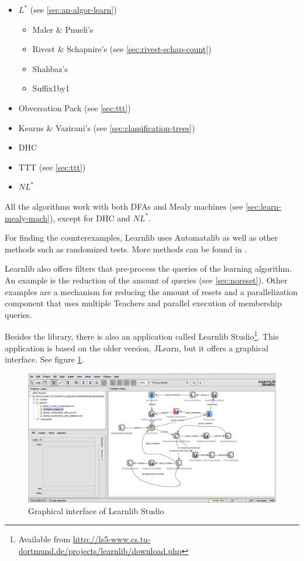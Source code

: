 \begin{itemize}
	\item $L^*$ (see \cref{sec:an-algor-learn})
	\begin{itemize}
		\item Maler \& Pnueli's \cite{Maler1995}
		\item Rivest \& Schapnire's (see \cref{sec:rivest-schap-count})
		\item Shahbaz's \cite{Shahbaz2009}
		\item Suffix1by1 \cite{Irfan2010}
	\end{itemize}
	\item Obversation Pack (see \cref{sec:ttt})
	\item Kearns \& Vazirani's (see \cref{sec:classification-trees})
	\item DHC \cite{Merten2012}
	\item TTT (see \cref{sec:ttt})
	\item $NL^*$ \cite{Bollig2009}
\end{itemize}

All the algorithms work with both DFAs and Mealy machines (see 
\cref{sec:learn-mealy-mach}), except for DHC\cite{Merten2012} and
$NL^*$\cite{Bollig2009}.

For finding the counterexamples, Learnlib uses Automatalib as well as other
methods such as randomized tests. More methods can be found in
\cite[p. 490]{Isberner2015b}.

Learnlib also offers filters that pre-process the queries of the learning
algorithm. An example is the reduction of the amount of queries (see 
\cref{sec:noreset}). Other examples are a mechanism for reducing the amount of
resets  and a parallelization component that uses multiple Teachers and
parallel execution of membership queries\cite{Henrix2015,Howar2012}.


Besides the library, there is also an application called Learnlib 
Studio\footnote{Available from 
\url{http://ls5-www.cs.tu-dortmund.de/projects/learnlib/download.php}}. 
This application is based on the older version, JLearn, but it offers a 
graphical interface. See figure \ref{fig:learnlib_studio}. 

	\begin{figure}[H]
		\includegraphics[width=\textwidth]{Tool_images/learnlib_studio_interface.png}
		\caption{Graphical interface of Learnlib Studio}
		\label{fig:learnlib_studio}
	\end{figure}

